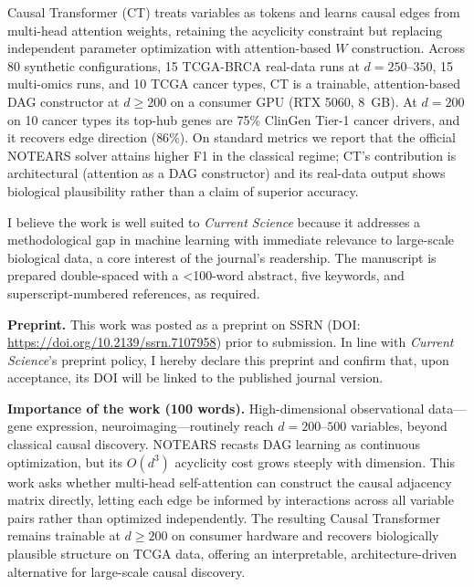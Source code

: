 \documentclass[12pt,a4paper]{article}
\begin{document}
Causal Transformer (CT) treats variables as tokens and learns causal edges from multi-head attention weights, retaining the acyclicity constraint but replacing independent parameter optimization with attention-based $W$ construction. Across 80 synthetic configurations, 15 TCGA-BRCA real-data runs at $d=250$--$350$, 15 multi-omics runs, and 10 TCGA cancer types, CT is a trainable, attention-based DAG constructor at $d \ge 200$ on a consumer GPU (RTX 5060, 8~GB). At $d=200$ on 10 cancer types its top-hub genes are 75\% ClinGen Tier-1 cancer drivers, and it recovers edge direction ($86\%$). On standard metrics we report that the official NOTEARS solver attains higher F1 in the classical regime; CT's contribution is architectural (attention as a DAG constructor) and its real-data output shows biological plausibility rather than a claim of superior accuracy.

\vspace{0.3cm}

I believe the work is well suited to \textit{Current Science} because it addresses a methodological gap in machine learning with immediate relevance to large-scale biological data, a core interest of the journal's readership. The manuscript is prepared double-spaced with a {\textless}100-word abstract, five keywords, and superscript-numbered references, as required.

\vspace{0.3cm}

\textbf{Preprint.} This work was posted as a preprint on SSRN (DOI: \url{https://doi.org/10.2139/ssrn.7107958}) prior to submission. In line with \textit{Current Science}'s preprint policy, I hereby declare this preprint and confirm that, upon acceptance, its DOI will be linked to the published journal version.

\vspace{0.3cm}

\textbf{Importance of the work (100 words).} High-dimensional observational data---gene expression, neuroimaging---routinely reach $d=200$--$500$ variables, beyond classical causal discovery. NOTEARS recasts DAG learning as continuous optimization, but its $O(d^3)$ acyclicity cost grows steeply with dimension. This work asks whether multi-head self-attention can construct the causal adjacency matrix directly, letting each edge be informed by interactions across all variable pairs rather than optimized independently. The resulting Causal Transformer remains trainable at $d\ge200$ on consumer hardware and recovers biologically plausible structure on TCGA data, offering an interpretable, architecture-driven alternative for large-scale causal discovery.
\end{document}
